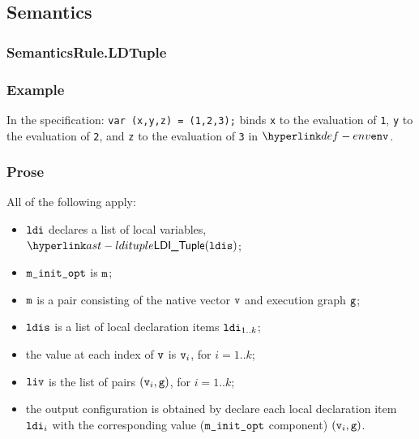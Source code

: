 \subsection{Semantics}
\subsubsection{SemanticsRule.LDTuple\label{sec:SemanticsRule.LDTuple}}
\subsubsection{Example}
In the specification:
\texttt{var (x,y,z) = (1,2,3);} binds \texttt{x} to the evaluation of
\texttt{1}, \texttt{y} to the evaluation of \texttt{2}, and \texttt{z} to the
evaluation of \texttt{3} in $\env$.

\subsubsection{Prose}
All of the following apply:
\begin{itemize}
  \item $\texttt{ldi}$ declares a list of local variables, $\LDITuple(\ldis)$;
  \item $\texttt{m\_init\_opt}$ is $\texttt{m}$;
  \item $\texttt{m}$ is a pair consisting of the native vector $\texttt{v}$ and execution graph $\texttt{g}$;
  \item $\texttt{ldis}$ is a list of local declaration items $\texttt{ldi}_{1..k}$;
  \item the value at each index of $\texttt{v}$ is $\texttt{v}_i$, for $i=1..k$;
  \item $\texttt{liv}$ is the list of pairs $(\texttt{v}_i, \texttt{g})$, for $i=1..k$;
  \item the output configuration is obtained by declare each local declaration item $\texttt{ldi}_i$
  with the corresponding value ($\texttt{m\_init\_opt}$ component) $(\texttt{v}_i, \texttt{g})$.
\end{itemize}
